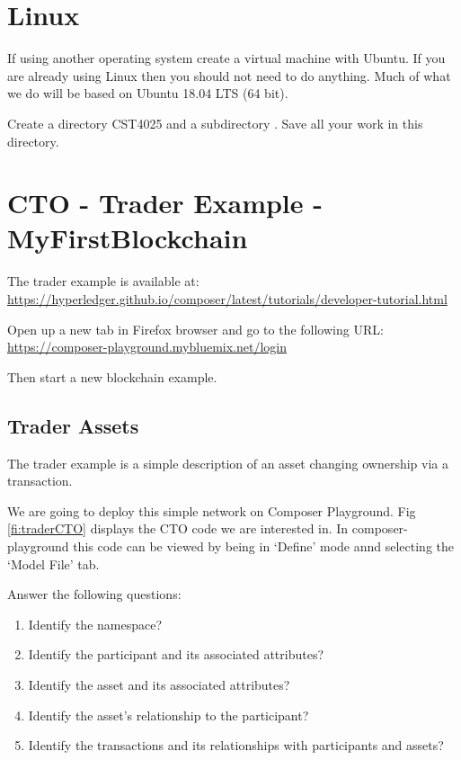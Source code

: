 
\section{Linux}
If using another operating system create a virtual machine with Ubuntu. If you are already using Linux then you should not need to do anything. Much of what we do will be based on Ubuntu 18.04 LTS (64 bit).

Create a directory CST4025 and a subdirectory \theweek. Save all your work in this directory. 


\section{CTO - Trader Example - MyFirstBlockchain}
The trader example is available at: \\
\url{https://hyperledger.github.io/composer/latest/tutorials/developer-tutorial.html}

Open up a new tab in Firefox browser and go to the following URL:\\
\url{https://composer-playground.mybluemix.net/login}

Then start a new blockchain example.

\subsection{Trader Assets} 
The trader example is a simple description of an asset changing ownership via a transaction. 

We are going to deploy this simple network on Composer Playground. Fig \ref{fi:traderCTO} displays the CTO code we are interested in. In composer-playground this code can be viewed by being in `Define' mode annd selecting the `Model File' tab.

Answer the following questions:
\begin{enumerate}
	\item Identify the namespace?
	\item Identify the participant and its associated attributes?
	\item Identify the asset and its associated attributes?
	\item Identify the asset's relationship to the participant?
	\item Identify the transactions and its relationships with participants and assets?
\end{enumerate}

